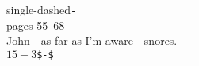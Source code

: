 \documentclass[crop]{standalone}
\begin{document}
\noindent
single-dashed\hfill\verb|-|\\[12pt]
\noindent
pages 55--68\hfill\verb|--|\\[12pt]
\noindent
John---as far as I'm aware---snores.\hfill\verb|---|\\[12pt]
\noindent
$15 -3 $\hfill\verb|$-$|
\end{document}
